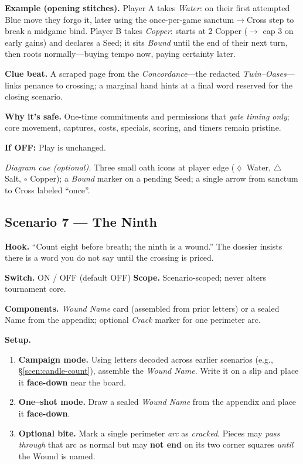 \documentclass[11pt]{article}
\numberwithin{equation}{section} %
\theoremstyle{plain} %
\theoremstyle{definition} %
\theoremstyle{remark} %
\begin{document}
\medskip
\noindent\textbf{Example (opening stitches).}  
Player A takes \textit{Water}: on their first attempted Blue move they forgo it, later using the once-per-game sanctum\(\to\)Cross step to break a midgame bind.  
Player B takes \textit{Copper}: starts at 2 Copper (\( \to \) cap 3 on early gains) and declares a Seed; it sits \emph{Bound} until the end of their next turn, then roots normally—buying tempo now, paying certainty later.

\medskip
\noindent\textbf{Clue beat.} A scraped page from the \emph{Concordance}—the redacted \emph{Twin–Oases}—links penance to crossing; a marginal hand hints at a final word reserved for the closing scenario.

\medskip
\noindent\textbf{Why it’s safe.} One-time commitments and permissions that \emph{gate timing only}; core movement, captures, costs, specials, scoring, and timers remain pristine.

\medskip
\noindent\textbf{If \textsc{OFF}:} Play is unchanged.

\medskip
\noindent\textit{Diagram cue (optional).} Three small oath icons at player edge (\(\lozenge\) Water, \(\triangle\) Salt, \(\circ\) Copper); a \emph{Bound} marker on a pending Seed; a single arrow from sanctum to Cross labeled “once”.

\subsection{Scenario 7 — The Ninth}
\label{scen:the-ninth}

\noindent\textbf{Hook.} “Count eight before breath; the ninth is a wound.” The dossier insists there is a word you do not say until the crossing is priced.

\medskip
\noindent\textbf{Switch.} \textsc{ON / OFF} (default \textsc{OFF}) \hfill \textbf{Scope.} Scenario-scoped; never alters tournament core.

\medskip
\noindent\textbf{Components.} \emph{Wound Name} card (assembled from prior letters) or a sealed Name from the appendix; optional \emph{Crack} marker for one perimeter arc.

\medskip
\noindent\textbf{Setup.}
\begin{enumerate}\setlength\itemsep{0.2em}
  \item \textbf{Campaign mode.} Using letters decoded across earlier scenarios (e.g., \S\ref{scen:candle-count}), assemble the \emph{Wound Name}. Write it on a slip and place it \textbf{face-down} near the board.
  \item \textbf{One–shot mode.} Draw a sealed \emph{Wound Name} from the appendix and place it \textbf{face-down}.
  \item \textbf{Optional bite.} Mark a single perimeter \emph{arc} as \emph{cracked}. Pieces may \emph{pass through} that arc as normal but may \textbf{not end} on its two corner squares \textit{until} the Wound is named.
\end{enumerate}
\end{document}
